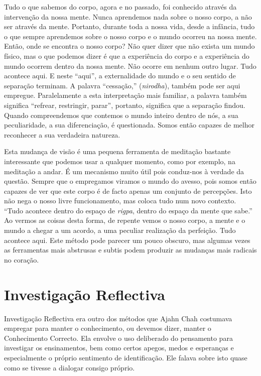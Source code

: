 Tudo o que sabemos do corpo, agora e no passado, foi conhecido através
da intervenção da nossa mente. Nunca aprendemos nada sobre o nosso
corpo, a não ser através da mente. Portanto, durante toda a nossa vida,
desde a infância, tudo o que sempre aprendemos sobre o nosso corpo e o
mundo ocorreu na nossa mente. Então, onde se encontra o nosso corpo? Não
quer dizer que não exista um mundo físico, mas o que podemos dizer é que
a experiência do corpo e a experiência do mundo ocorrem dentro da nossa
mente. Não ocorre em nenhum outro lugar. Tudo acontece aqui. E neste
``aqui'', a externalidade do mundo e o seu sentido de separação
terminam. A palavra ``cessação,'' (\emph{nirodha}), também pode ser aqui
empregue. Paralelamente a esta interpretação mais familiar, a palavra
também significa ``refrear, restringir, parar'', portanto, significa que
a separação findou. Quando compreendemos que contemos o mundo inteiro
dentro de nós, a sua peculiaridade, a sua diferenciação, é questionada.
Somos então capazes de melhor reconhecer a sua verdadeira natureza. 

Esta mudança de visão é uma pequena ferramenta de meditação bastante
interessante que podemos usar a qualquer momento, como por exemplo, na
meditação a andar. É um mecanismo muito útil pois conduz-nos à verdade
da questão. Sempre que o empregamos viramos o mundo do avesso, pois
somos então capazes de ver que este corpo é de facto apenas um conjunto
de percepções. Isto não nega o nosso livre funcionamento, mas coloca
tudo num novo contexto. ``Tudo acontece dentro do espaço
de \emph{rigpa}, dentro do espaço da mente que sabe.'' Ao vermos as
coisas desta forma, de repente vemos o nosso corpo, a mente e o mundo a
chegar a um acordo, a uma peculiar realização da perfeição. Tudo
acontece aqui. Este método pode parecer um pouco obscuro, mas algumas
vezes as ferramentas mais abstrusas e subtis podem produzir as mudanças
mais radicais no coração.

\section{Investigação Reflectiva}

Investigação Reflectiva era outro dos métodos que Ajahn Chah costumava
empregar para manter o conhecimento, ou devemos dizer, manter o
Conhecimento Correcto. Ela envolve o uso deliberado do pensamento para
investigar os ensinamentos, bem como certos apegos, medos e esperanças
e especialmente o próprio sentimento de identificação. Ele falava sobre
isto quase como se tivesse a dialogar consigo próprio.

